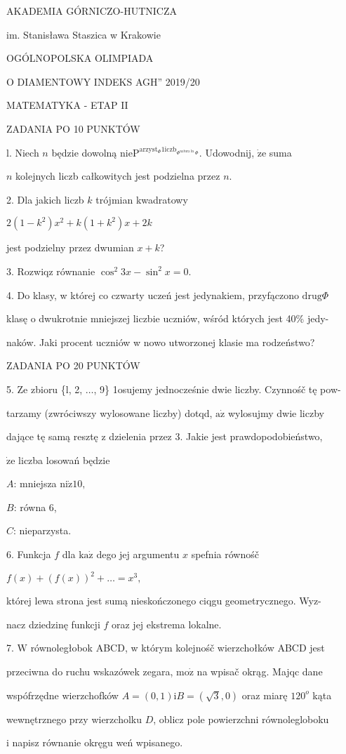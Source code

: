 \documentclass[a4paper,12pt]{article}
\begin{document}
AKADEMIA GÓRNICZO-HUTNICZA

im. Stanisława Staszica w Krakowie

OGÓLNOPOLSKA OLIMPIADA

O DIAMENTOWY INDEKS AGH'' 2019/20

MATEMATYKA - ETAP II

ZADANIA PO 10 PUNKTÓW

l. Niech $n$ będzie dowolną $\mathrm{n}\mathrm{i}\mathrm{e}\mathrm{P}^{\mathrm{a}\mathrm{r}\mathrm{z}\mathrm{y}\mathrm{s}\mathrm{t}_{\Phi}1\mathrm{i}\mathrm{c}\mathrm{z}\mathrm{b}_{\Phi^{\mathrm{n}\mathrm{a}\mathrm{t}\mathrm{u}\mathrm{r}\mathrm{a}\ln}\Phi}}$. Udowodnij, $\dot{\mathrm{z}}\mathrm{e}$ suma

$n$ kolejnych liczb całkowitych jest podzielna przez $n.$

2. Dla jakich liczb $k$ trójmian kwadratowy

$2(1-k^{2})x^{2}+k(1+k^{2})x+2k$

jest podzielny przez dwumian $x+k$?

3. Rozwiqz równanie $\cos^{2}3x-\sin^{2}x=0.$

4. Do klasy, w której co czwarty uczeń jest jedynakiem, przyfączono $\mathrm{d}\mathrm{r}\mathrm{u}\mathrm{g}\Phi$

klasę o dwukrotnie mniejszej liczbie uczniów, wśród których jest 40\% jedy-

naków. Jaki procent uczniów w nowo utworzonej klasie ma rodzeństwo?

ZADANIA PO 20 PUNKTÓW

5. Ze zbioru \{l, 2, $\ldots$, 9\} 1osujemy jednocześnie dwie liczby. Czynnośč tę pow-

tarzamy (zwróciwszy wylosowane liczby) dotqd, $\mathrm{a}\dot{\mathrm{z}}$ wylosujmy dwie liczby

dające tę samą resztę z dzielenia przez 3. Jakie jest prawdopodobieństwo,

$\dot{\mathrm{z}}\mathrm{e}$ liczba losowań będzie

$A$: mniejsza $\mathrm{n}\mathrm{i}\dot{\mathrm{z}}10,$

$B$: równa 6,

$C$: nieparzysta.

6. Funkcja $f$ dla $\mathrm{k}\mathrm{a}\dot{\mathrm{z}}$ dego jej argumentu $x$ spefnia równośč

$f(x)+(f(x))^{2}+\ldots=x^{3},$

której lewa strona jest sumą nieskończonego ciqgu geometrycznego. Wyz-

nacz dziedzinę funkcji $f$ oraz jej ekstrema lokalne.

7. $\mathrm{W}$ równoległobok ABCD, w którym kolejnośč wierzchołków ABCD jest

przeciwna do ruchu wskazówek zegara, $\mathrm{m}\mathrm{o}\dot{\mathrm{z}}$ na wpisač okrąg. Majqc dane

wspófrzędne wierzchofków $A= (0,1) \mathrm{i}B= (\sqrt{3},0)$ oraz miarę $120^{o}$ kąta

wewnętrznego przy wierzcholku $D$, oblicz pole powierzchni równolegloboku

i napisz równanie okręgu weń wpisanego.
\end{document}

